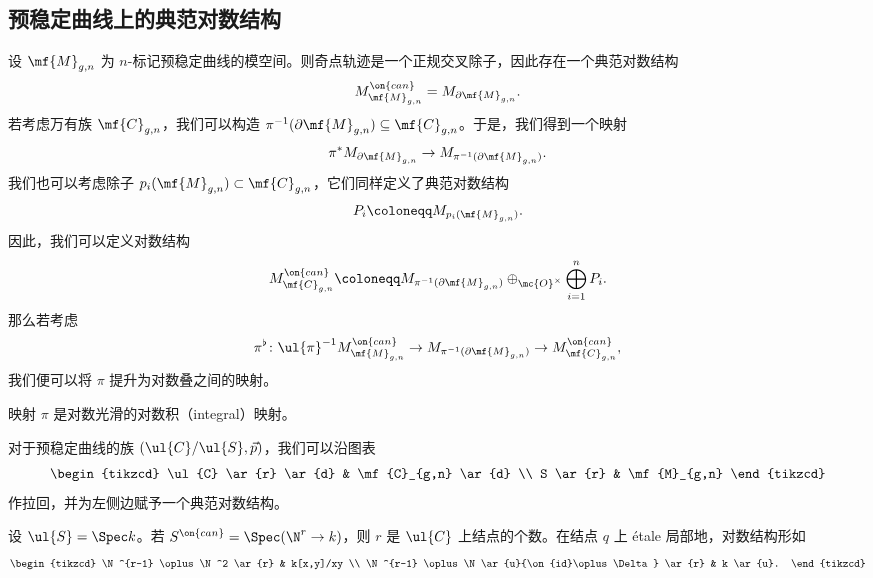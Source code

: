 \subsection{预稳定曲线上的典范对数结构}%
\label{sub:Canonical log structures on prestable curves}

设 \(\mf{M}_{g,n}\) 为 \(n\)-标记预稳定曲线的模空间。则奇点轨迹是一个正规交叉除子，因此存在一个典范对数结构
\[ M_{\mf{M}_{g,n}}^{\on{can}} = M_{\partial \mf{M}_{g,n}}. \]
若考虑万有族 \(\mf{C}_{g,n}\)，我们可以构造 \(\pi^{-1}(\partial \mf{M}_{g,n}) \subseteq \mf{C}_{g,n}\)。于是，我们得到一个映射
\[ \pi^* M_{\partial \mf{M}_{g,n}} \to M_{\pi^{-1}(\partial \mf{M}_{g,n})}. \]
我们也可以考虑除子 \(p_i(\mf{M}_{g,n}) \subset \mf{C}_{g,n}\)，它们同样定义了典范对数结构
\[ P_i \coloneqq M_{p_i(\mf{M}_{g,n})}. \]
因此，我们可以定义对数结构
\[ M_{\mf{C}_{g,n}}^{\on{can}} \coloneqq M_{\pi^{-1}(\partial\mf{M}_{g,n})} \oplus_{\mc{O}^{\times}} \bigoplus_{i=1}^n P_i. \]
那么若考虑
\[ \pi^{\flat} \colon \ul{\pi}^{-1} M_{\mf{M}_{g,n}}^{\on{can}} \to M_{\pi^{-1}(\partial \mf{M}_{g,n})} \to M_{\mf{C}_{g,n}}^{\on{can}}, \]
我们便可以将 \(\pi\) 提升为对数叠之间的映射。

\begin{thm}
    映射 \(\pi\) 是对数光滑的对数积（integral）映射。
\end{thm}

\begin{defn}
    对于预稳定曲线的族 \((\ul{C}/\ul{S}, \vec{p})\)，我们可以沿图表
    \begin{equation*}
    \begin{tikzcd}
        \ul{C} \ar{r} \ar{d} & \mf{C}_{g,n} \ar{d} \\
        S \ar{r} & \mf{M}_{g,n}
    \end{tikzcd}
    \end{equation*}
    作拉回，并为左侧边赋予一个典范对数结构。
\end{defn}

\begin{rmk}
    设 \(\ul{S} = \Spec k\)。若 \(S^{\on{can}} = \Spec (\N^r \to k)\)，则 \(r\) 是 \(\ul{C}\) 上结点的个数。在结点 \(q\) 上 \'etale 局部地，对数结构形如
    \begin{equation*}
    \begin{tikzcd}
        \N^{r-1} \oplus \N^2 \ar{r} & k[x,y]/xy \\
        \N^{r-1} \oplus \N \ar{u}{\on{id}\oplus\Delta} \ar{r} & k \ar{u}.
    \end{tikzcd}
    \end{equation*}
\end{rmk}

